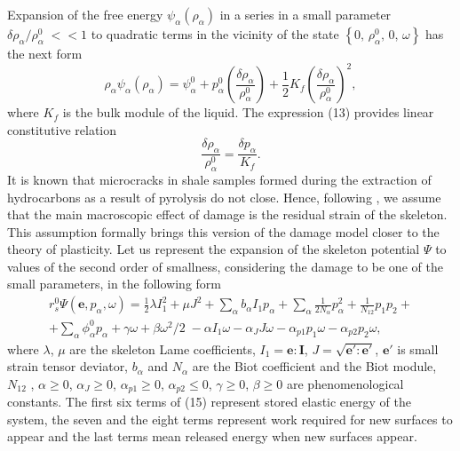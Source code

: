 \documentclass[article,authoryear,jpm]{beg_39}             %
\begin{document}
Expansion of the free energy
${{\psi }_{\alpha }}\left( {{\rho }_{\alpha }} \right)$
in a series in a small parameter
${\delta {{\rho }_{\alpha }}}/{\rho _{\alpha }^{0}}\;<<1$
to quadratic terms in the vicinity of the state
$\left\{ 0,\,\rho_{\alpha }^{0},\,0,\,\omega \right\}$
has the next form
\begin{equation}
{{\rho }_{\alpha }}{{\psi }_{\alpha }}\left( {{\rho }_{\alpha }} \right)=\psi _{\alpha }^{0}+p_{\alpha }^{0}\left( \frac{\delta {{\rho }_{\alpha }}}{\rho _{\alpha }^{0}} \right)+\frac{1}{2}{{K}_{f}}{{\left( \frac{\delta {{\rho }_{\alpha }}}{\rho _{\alpha }^{0}} \right)}^{2}},
\end{equation}
where ${{K}_{f}}$ is the bulk module of the liquid. The expression (13) provides linear constitutive relation
\begin{equation}
\frac{\delta {{\rho }_{\alpha }}}{\rho _{\alpha }^{0}}=\frac{\delta {{p}_{\alpha }}}{{{K}_{f}}}.
\end{equation}
It is known that microcracks in shale samples formed during the extraction of hydrocarbons as a result of pyrolysis do not close.
Hence, following \cite{Kondaurov2002, Izvekov, Izvekov2020}, we assume that the main macroscopic effect of damage is the residual strain of the skeleton.
This assumption formally brings this version of the damage model closer to the theory of plasticity.
Let us represent the expansion of the skeleton potential $\Psi $ to values of the second order of smallness, considering the damage to be one of the small parameters, in the following form
\begin{eqnarray}
r_{s}^{0} \Psi (\mathbf{e},{{p}_{\alpha }},\omega )=\frac{1}{2} \lambda I_{1}^{2}+\mu {{J}^{2}}+\sum\limits_{\alpha }{{{b}_{\alpha }}{{I}_{1}}{{p}_{\alpha}}} +\sum\limits_{\alpha }{\frac{1}{2{{N}_{\alpha }}}p_{\alpha }^{2}}+\frac{1}{{{N}_{12}}}{{p}_{1}}{{p}_{2}}+ \nonumber \\ +\sum \limits_{\alpha }{\phi _{\alpha }^{0}{{p}_{\alpha }}}+\gamma \omega +\beta {{{\omega }^{2}}}/{2}\;-\alpha {{I}_{1}}\omega -{{\alpha}_{J}}J \omega -{{\alpha }_{p1}}{{p}_{1}} \omega -{{\alpha }_{p2}}{{p}_{2}} \omega,
\end{eqnarray}
where $\lambda$, $\mu$ are the skeleton Lame coefficients, ${{I}_{1}}=\mathbf{e}:\mathbf{I}$, $J=\sqrt{\mathbf{{e}'}:\mathbf{{e}'}}$, $\mathbf{{e}'}$ is small strain tensor deviator, ${{b}_{\alpha }}$ and ${{N}_{\alpha }}$ are the Biot coefficient and the Biot module, ${{N}_{12}}$ , $\alpha \ge 0$, ${{\alpha }_{J}}\ge 0$, ${{\alpha }_{p1}}\ge 0$, ${{\alpha }_{p2}}\le 0$, $\gamma \ge 0$, $\beta \ge 0$ are phenomenological constants.
The first six terms of (15) represent stored elastic energy of the system, the seven and the eight terms represent work required for new surfaces to appear and the last terms mean released energy when new surfaces appear.
\end{document}
